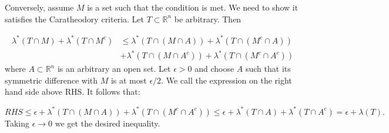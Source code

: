 \documentclass[12pt]{amsart} %
\def\R{\mathbb{R}}
\begin{document}
Conversely, assume $M$ is a set such that the condition is met. We need to show it satisfies the Caratheodory criteria. Let $T \subset \R^n$ be arbitrary. Then

\begin{align*}
	\lambda^*\left( T \cap M \right) + \lambda^*\left( T \cap M^c \right) &\le \lambda^*\left( T \cap (M \cap A) \right) + \lambda^*\left( T \cap (M^c \cap A) \right) \\
	&+ \lambda^*\left( T \cap (M \cap A^c) \right) + \lambda^*\left( T \cap (M^c \cap A^c) \right) 	
\end{align*}
where $A \subset \R^n$ is an arbitrary an open set. Let $\epsilon>0$ and choose $A$ such that its symmetric difference with  $M$ is at most  $\epsilon/2$. We call the expression on the right hand side above RHS. It follows that: 

$$RHS \le \epsilon + \lambda^*(T \cap (M \cap A)) + \lambda^*(T \cap (M^c \cap A^c)) \le  \epsilon + \lambda^*(T \cap A) +  \lambda^*(T \cap A^c) = \epsilon+ \lambda(T).$$ Taking $\epsilon \to 0$ we get the desired inequality. 







  




















\vfill 
 
\end{document}
